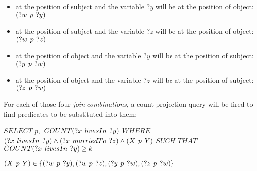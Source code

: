 \begin{itemize}
    \item at the position of subject and the variable $?y$ will be at the position of object: $(?w\hspace{0.4em}p\hspace{0.4em}?y)$
    \item at the position of subject and the variable $?z$ will be at the position of object: $(?w\hspace{0.4em}p\hspace{0.4em}?z)$
    \item at the position of object and the variable $?y$ will be at the position of subject: $(?y\hspace{0.4em}p\hspace{0.4em}?w)$
    \item at the position of object and the variable $?z$ will be at the position of subject: $(?z\hspace{0.4em}p\hspace{0.4em}?w)$
\end{itemize}

For each of those four \textit{join combinations}, a count projection query will be fired to find predicates to be substituted into them:

$SELECT$ $p,$ $COUNT(?x\hspace{0.4em}livesIn\hspace{0.4em}?y)\\$ 
$WHERE$ $(?x\hspace{0.4em}livesIn\hspace{0.4em}?y) \land (?x\hspace{0.4em}marriedTo\hspace{0.4em}?z) \land (X\hspace{0.4em}p\hspace{0.4em}Y)\\$
$SUCH$ $THAT$ $COUNT(?x\hspace{0.4em}livesIn\hspace{0.4em}?y)\geq k$

$(X\hspace{0.4em}p\hspace{0.4em}Y) \in \{(?w\hspace{0.4em}p\hspace{0.4em}?y),(?w\hspace{0.4em}p\hspace{0.4em}?z),(?y\hspace{0.4em}p\hspace{0.4em}?w),(?z\hspace{0.4em}p\hspace{0.4em}?w)\}$

